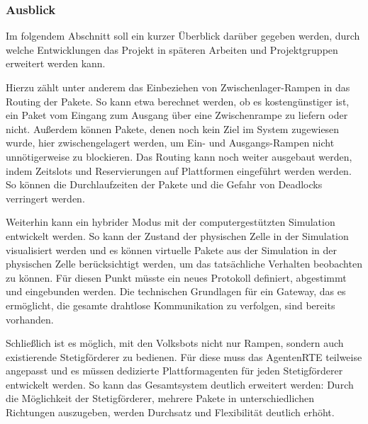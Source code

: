 \subsubsection{Ausblick}
Im folgendem Abschnitt soll ein kurzer Überblick darüber gegeben werden, durch welche Entwicklungen das Projekt in späteren Arbeiten und Projektgruppen erweitert werden kann. 

Hierzu zählt unter anderem das Einbeziehen von Zwischenlager-Rampen in das Routing der Pakete. So kann etwa berechnet werden, ob es kostengünstiger ist, ein Paket vom Eingang zum Ausgang über eine Zwischenrampe zu liefern oder nicht. Außerdem können Pakete, denen noch kein Ziel im System zugewiesen wurde, hier zwischengelagert werden, um Ein- und Ausgangs-Rampen nicht unnötigerweise zu blockieren.
Das Routing kann noch weiter ausgebaut werden, indem Zeitslots und Reservierungen auf Plattformen eingeführt werden werden. So können die Durchlaufzeiten der Pakete und die Gefahr von Deadlocks verringert werden.

Weiterhin kann ein hybrider Modus mit der computergestützten Simulation entwickelt werden. So kann der Zustand der physischen Zelle in der Simulation visualisiert werden und es können virtuelle Pakete aus der Simulation in der physischen Zelle berücksichtigt werden, um das tatsächliche Verhalten beobachten zu können. Für diesen Punkt müsste ein neues Protokoll definiert, abgestimmt und eingebunden werden. Die technischen Grundlagen für ein Gateway, das es ermöglicht, die gesamte drahtlose Kommunikation zu verfolgen, sind bereits vorhanden.

Schließlich ist es möglich, mit den Volksbots nicht nur Rampen, sondern auch existierende Stetigförderer zu bedienen. Für diese muss das AgentenRTE teilweise angepasst und es müssen dedizierte Plattformagenten für jeden Stetigförderer entwickelt werden. So kann das Gesamtsystem deutlich erweitert werden: Durch die Möglichkeit der Stetigförderer, mehrere Pakete in unterschiedlichen Richtungen auszugeben, werden Durchsatz und Flexibilität deutlich erhöht.
